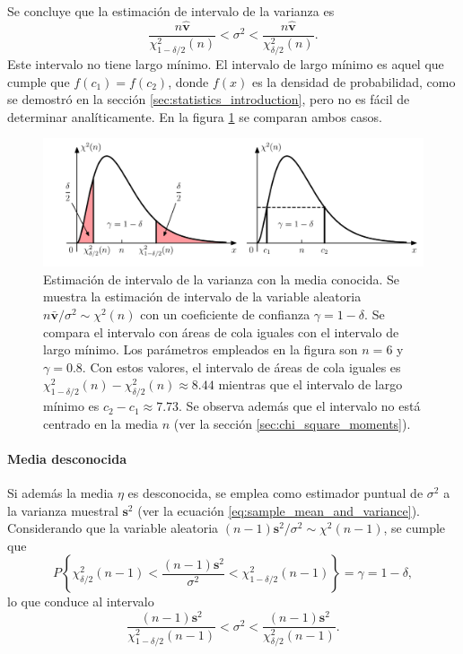 \documentclass[a4paper]{report}
\newcommand{\vbf}{\mathbf{v}}
\newcommand{\s}{\mathbf{s}}
\begin{document}
Se concluye que la estimación de intervalo de la varianza es
\[
 \frac{n\hat{\vbf}}{\chi^2_{1-\delta/2}(n)}<\sigma^2<\frac{n\hat{\vbf}}{\chi^2_{\delta/2}(n)}.
\]
Este intervalo no tiene largo mínimo. El intervalo de largo mínimo es aquel que cumple que \(f(c_1)=f(c_2)\), donde \(f(x)\) es la densidad de probabilidad, como se demostró en la sección \ref{sec:statistics_introduction}, pero no es fácil de determinar analíticamente. En la figura \ref{fig:variance_interval_estimation_chi_rv} se comparan ambos casos.
\begin{figure}[!htb]
\begin{center}
\includegraphics[width=0.95\columnwidth]{figuras/variance_interval_estimation_chi_rv.pdf}
\caption{\label{fig:variance_interval_estimation_chi_rv} Estimación de intervalo de la varianza con la media conocida. Se muestra la estimación de intervalo de la variable aleatoria \(n\bar{\vbf}/\sigma^2\sim\chi^2(n)\) con un coeficiente de confianza \(\gamma=1-\delta\). Se compara el intervalo con áreas de cola iguales con el intervalo de largo mínimo. Los parámetros empleados en la figura son \(n=6\) y \(\gamma=0.8\). Con estos valores, el intervalo de áreas de cola iguales es \(\chi^2_{1-\delta/2}(n)-\chi^2_{\delta/2}(n)\approx8.44\) mientras que el intervalo de largo mínimo es \(c_2-c_1\approx7.73\). Se observa además que el intervalo no está centrado en la media \(n\) (ver la sección \ref{sec:chi_square_moments}).}
\end{center}
\end{figure}

\paragraph{Media desconocida} Si además la media \(\eta\) es desconocida, se emplea como estimador puntual de \(\sigma^2\) a la varianza muestral \(\s^2\) (ver la ecuación \ref{eq:sample_mean_and_variance}). Considerando que la variable aleatoria \((n-1)\s^2/\sigma^2\sim\chi^2(n-1)\), se cumple que 
\[
 P\left\{\chi^2_{\delta/2}(n-1)<\frac{(n-1)\s^2}{\sigma^2}<\chi^2_{1-\delta/2}(n-1)\right\}=\gamma=1-\delta,
\]
lo que conduce al intervalo
\[
 \frac{(n-1)\s^2}{\chi^2_{1-\delta/2}(n-1)}<\sigma^2<\frac{(n-1)\s^2}{\chi^2_{\delta/2}(n-1)}.
\]
\end{document}
